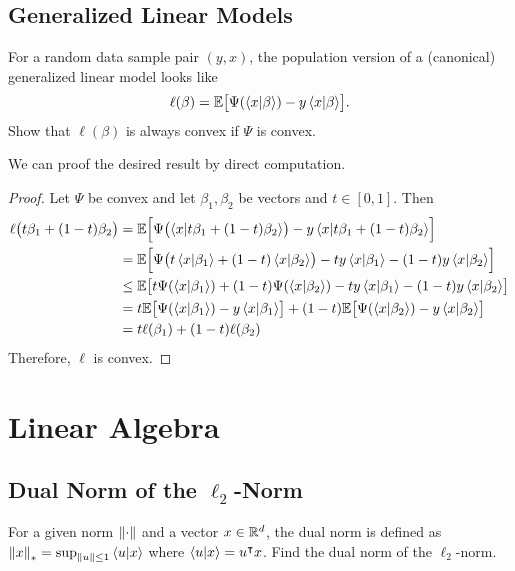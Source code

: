     \subsection{Generalized Linear Models}
        For a random data sample pair \((y, x)\), the population version of a (canonical) generalized linear model looks like
        \begin{equation}
            \ell(\beta) = \E\bigl[ \Psi(\ip{x}{\beta}) - y \ip{x}{\beta} \bigr].
        \end{equation}
        Show that \(\ell(\beta)\) is always convex if \(\Psi\) is convex.

        \begin{solution}
            We can proof the desired result by direct computation.
            \begin{proof}
                Let \(\Psi\) be convex and let \(\beta_1, \beta_2\) be vectors and \(t \in [0, 1]\). Then
                \begin{align}
                    \ell\bigl(t \beta_1 + (1 - t) \beta_2\bigr)
                        &= \E\Bigl[ \Psi\bigl( \ip{x}{t \beta_1 + (1 - t) \beta_2} \bigr) - y \ip{x}{t \beta_1 + (1 - t) \beta_2} \Bigr] \\
                        &= \E\Bigl[ \Psi\bigl(t \ip{x}{\beta_1} + (1 - t) \ip{x}{\beta_2} \bigr) - t y \ip{x}{\beta_1} - (1 - t) y \ip{x}{\beta_2} \Bigr] \\
                        &\leq \E\bigl[ t \Psi(\ip{x}{\beta_1}) + (1 - t) \Psi(\ip{x}{\beta_2}) - t y \ip{x}{\beta_1} - (1 - t) y \ip{x}{\beta_2} \bigr] \\
                        &= t \E\bigl[ \Psi(\ip{x}{\beta_1}) - y \ip{x}{\beta_1} \bigr] + (1 - t) \E\bigl[ \Psi(\ip{x}{\beta_2}) - y \ip{x}{\beta_2} \bigr] \\
                        &= t \ell(\beta_1) + (1 - t) \ell(\beta_2)
                \end{align}
                Therefore, \(\ell\) is convex.
            \end{proof}
        \end{solution}

\section{Linear Algebra}
    \subsection{Dual Norm of the \texorpdfstring{\(\ell_2\)}{l2}-Norm}
        For a given norm \(\norm{\cdot}\) and a vector \(x \in \mathbb{R}^d\), the dual norm is defined as \(\norm{x}_\ast = \sup_{\norm{u} \leq 1} \ip{u}{x}\) where \(\ip{u}{x} = u^\transposed x\). Find the dual norm of the \(\ell_2\)-norm.

